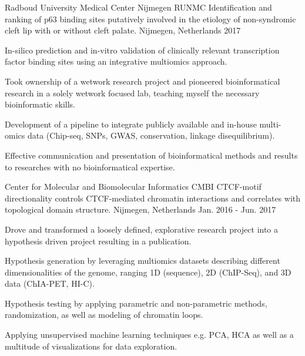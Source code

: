 

\begin{cventries}

  \cventry
    {Radboud University Medical Center Nijmegen RUNMC} %
    {Identification and ranking of p63 binding sites putatively
    involved in the etiology of non-syndromic cleft lip with or
    without cleft palate.} %
    {Nijmegen, Netherlands} %
    {2017} %
    { 
      \begin{cvitems} %
        \item {In-silico prediction and in-vitro validation of clinically relevant transcription factor binding sites using an integrative multiomics approach.}
        \item {Took ownership of a wetwork research project and pioneered bioinformatical research in a solely wetwork focused lab, teaching myself the necessary bioinformatic skills.}
        \item {Development of a pipeline to integrate publicly available and in-house multi-omics data (Chip-seq, SNPs, GWAS, conservation, linkage disequilibrium).}
        \item {Effective communication and presentation of bioinformatical methods and results to researches with no bioinformatical expertise.}
      \end{cvitems}
    }

  \cventry
    {Center for Molecular and Biomolecular Informatics CMBI} %
    {CTCF-motif directionality controls CTCF-mediated chromatin interactions
    and correlates with topological domain structure.} %
    {Nijmegen, Netherlands} %
    {Jan. 2016 - Jun. 2017} %
    {
      \begin{cvitems} %
        \item {Drove and transformed a loosely defined, explorative research project into a hypothesis driven project resulting in a publication.}
        \item {Hypothesis generation by leveraging multiomics datasets describing different dimensionalities of the genome, ranging 1D (sequence), 2D (ChIP-Seq), and 3D data (ChIA-PET, HI-C).}
        \item {Hypothesis testing by applying parametric and non-parametric methods, randomization, as well as modeling of chromatin loops.}
        \item {Applying unsupervised machine learning techniques e.g. PCA, HCA as well as a multitude of visualizations for data exploration.}
      \end{cvitems}
    }
\end{cventries}
